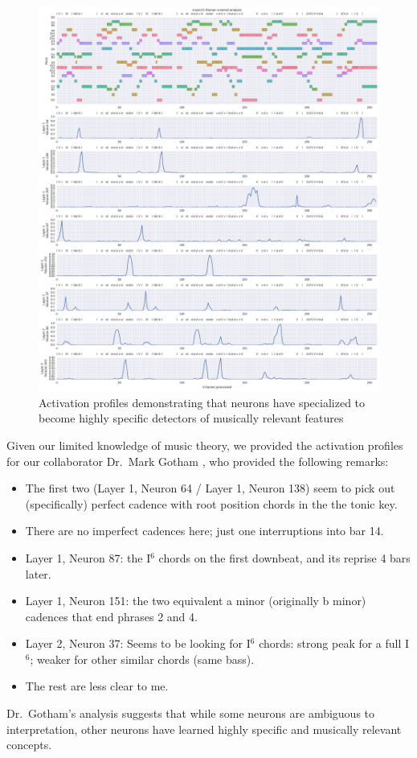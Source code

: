 \begin{figure}[tb]
    \centering
    \includegraphics[width=1.0\linewidth]{model-analysis-cells-individual.png}
    \caption{Activation profiles demonstrating that neurons have specialized to become
    highly specific detectors of musically relevant features}
    \label{fig:model-analysis-cells-individual}
\end{figure}

Given our limited knowledge of music theory, we provided the activation
profiles for our collaborator Dr.\ Mark Gotham \citet{mark-analysis}, who
provided the following remarks:
\begin{itemize}
    \item The first two (Layer 1, Neuron 64 / Layer 1, Neuron 138) seem to pick out (specifically) perfect cadence
        with root position chords in the the tonic key.
    \item There are no imperfect cadences here; just one interruptions into bar 14.
    \item Layer 1, Neuron 87: the I$^6$ chords on the first downbeat, and its reprise 4 bars later.
    \item Layer 1, Neuron 151: the two equivalent a minor (originally b minor) cadences that end phrases 2 and 4.
    \item Layer 2, Neuron 37: Seems to be looking for I$^6$ chords: strong peak
        for a full I$^6$; weaker for other similar chords (same bass).
    \item The rest are less clear to me.
\end{itemize}
Dr.\ Gotham's analysis suggests that while some neurons are ambiguous to interpretation,
other neurons have learned highly specific and musically relevant concepts.

